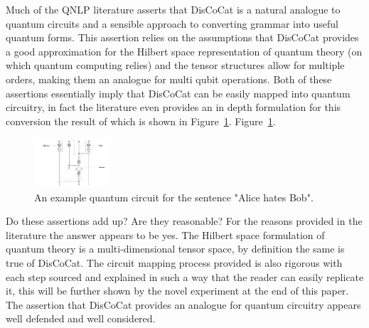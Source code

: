 \documentclass[a4paper,twocolumn,11pt]{quantumarticle}
\begin{document}
    Much of the QNLP literature asserts that DisCoCat is a natural analogue to quantum circuits and a sensible
    approach to converting grammar into useful quantum forms\cite{qnlp_in_prac, qnlp_near_term}.
    This assertion relies on the assumptions that DisCoCat provides a good approximation for the Hilbert
    space representation of quantum theory (on which quantum computing relies) and the tensor structures allow for
    multiple orders, making them an analogue for multi qubit operations.
    Both of these assertions essentially imply that DisCoCat can be easily mapped into quantum circuitry, in fact the
    literature even provides an in depth formulation for this conversion\cite{qnlp_near_term} the result of which is shown in
    Figure~\ref{fig:quantum-circuit}.
    Figure~\ref{fig:quantum-circuit}.
        \begin{figure}[h]
        \centering
        \includegraphics[width=0.25\textwidth]{quantum-circuit}
        \caption{An example quantum circuit for the sentence "Alice hates Bob"\cite{qubits_speak}.}
        \label{fig:quantum-circuit}
    \end{figure}
    Do these assertions add up?
    Are they reasonable?
    For the reasons provided in the literature the answer appears to be yes.
    The Hilbert space formulation of quantum theory is a multi-dimensional tensor
    space, by definition the same is true of DisCoCat\cite{discocat}.
    The circuit mapping process provided is also rigorous\cite{qnlp_near_term} with each step sourced and explained in
    such a way that the reader can easily replicate it, this will be further shown by the novel experiment at the end
    of this paper.
    The assertion that DisCoCat provides an analogue for quantum circuitry appears well defended and well considered.
\end{document}
